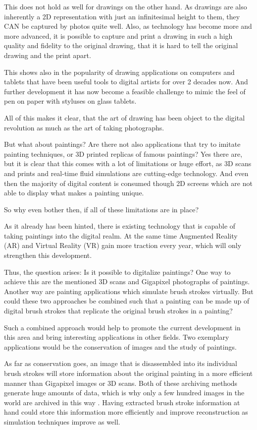This does not hold as well for drawings on the other hand. As drawings are also inherently a 2D representation with just an infinitesimal height to them, they CAN be captured by photos quite well.
Also, as technology has become more and more advanced, it is possible to capture and print a drawing in such a high quality and fidelity to the original drawing, that it is hard to tell the original drawing and the print apart.

This shows also in the popularity of drawing applications on computers and tablets that have been useful tools to digital artists for over 2 decades now.
And further development it has now become a feasible challenge to mimic the feel of pen on paper with styluses on glass tablets.

All of this makes it clear, that the art of drawing has been object to the digital revolution as much as the art of taking photographs.

But what about paintings?
Are there not also applications that try to imitate painting techniques, or 3D printed replicas of famous paintings?
Yes there are, but it is clear that this comes with a lot of limitations or huge effort, as 3D scans and prints and real-time fluid simulations are cutting-edge technology.
And even then the majority of digital content is consumed though 2D screens which are not able to display what makes a painting unique.

So why even bother then, if all of these limitations are in place?

As it already has been hinted, there is existing technology that is capable of taking paintings into the digital realm.
At the same time Augmented Reality (AR) and Virtual Reality (VR) gain more traction every year, which will only strengthen this development.

Thus, the question arises: Is it possible to digitalize paintings?
One way to achieve this are the mentioned 3D scans and Gigapixel photographs of paintings.
Another way are painting applications which simulate brush strokes virtually.
But could these two approaches be combined such that a painting can be made up of digital brush strokes that replicate the original brush strokes in a painting?

Such a combined approach would help to promote the current development in this area and bring interesting applications in other fields.
Two exemplary applications would be the conservation of images and the study of paintings.

As far as conservation goes, an image that is disassembled into its individual brush strokes will store information about the original painting in a more efficient manner than Gigapixel images or 3D scans.
Both of these archiving methods generate huge amounts of data, which is why only a few hundred images in the world are archived in this way \cite{googleartproject}.
Having extracted brush stroke information at hand could store this information more efficiently and improve reconstruction as simulation techniques improve as well.

